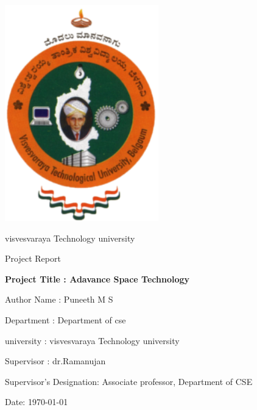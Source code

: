 \documentclass[a4paper,12pt]{report}
\begin{document}
\begin{titlepage}
    \centering
    \includegraphics[width=0.5\textwidth]{puneeth.png}\par
    \vspace{1cm}
    {\large{visvesvaraya Technology university}\par}
    \vspace{0.5cm}
    {\huge Project Report\par}
    \vspace{1.5cm}
    {\huge\bfseries Project Title : Adavance Space Technology \par}
    \vspace{1cm}
    {\large Author Name : Puneeth M S\par}
    {\Large Department : Department of cse\par}
    {\large university : visvesvaraya Technology university\par}
    \vfill
    {\large Supervisor : dr.Ramanujan\par}
    {\large Supervisor's Designation: Associate professor, Department of CSE\par}
    \vspace{0.8cm}
    {\large Date: \today\par}
\end{titlepage}
\newpage
\end{document}
